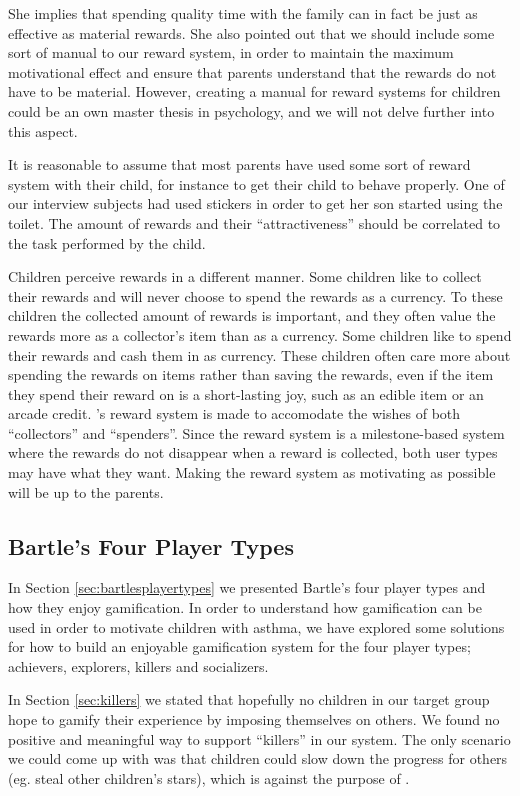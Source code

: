 She implies that spending quality time with the family can in fact be just as effective as material rewards. She also pointed out that we should include some sort of manual to our reward system, in order to maintain the maximum motivational effect and ensure that parents understand that the rewards do not have to be material. However, creating a manual for reward systems for children could be an own master thesis in psychology, and we will not delve further into this aspect. 

It is reasonable to assume that most parents have used some sort of reward system with their child, for instance to get their child to behave properly. One of our interview subjects had used stickers in order to get her son started using the toilet. The amount of rewards and their ``attractiveness'' should be correlated to the task performed by the child.

Children perceive rewards in a different manner. Some children like to collect their rewards and will never choose to spend the rewards as a currency. To these children the collected amount of rewards is important, and they often value the rewards more as a collector's item than as a currency. 
Some children like to spend their rewards and cash them in as currency. These children often care more about spending the rewards on items rather than saving the rewards, even if the item they spend their reward on is a short-lasting joy, such as an edible item or an arcade credit.
\app{}'s reward system is made to accomodate the wishes of both ``collectors'' and ``spenders''. Since the reward system is a milestone-based system where the rewards do not disappear when a reward is collected, both user types may have what they want. Making the reward system as motivating as possible will be up to the parents.


\subsection{Bartle's Four Player Types}
\label{sec:bartlesfourplayertypes}
In Section \ref{sec:bartlesplayertypes} we presented Bartle's four player types and how they enjoy gamification. In order to understand how gamification can be used in order to motivate children with asthma, we have explored some solutions for how to build an enjoyable gamification system for the four player types; achievers, explorers, killers and socializers. 


In Section \ref{sec:killers} we stated that hopefully no children in our target group hope to gamify their experience by imposing themselves on others. We found no positive and meaningful way to support ``killers'' in our system. The only scenario we could come up with was that children could slow down the progress for others (eg. steal other children's stars), which is against the purpose of \app{}.  

